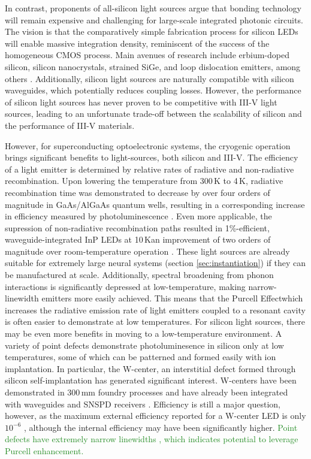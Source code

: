 \documentclass[twocolumn]{article}
\begin{document}
In contrast, proponents of all-silicon light sources argue that bonding technology will remain expensive and challenging for large-scale integrated photonic circuits. The vision is that the comparatively simple fabrication process for silicon LEDs will enable massive integration density, reminiscent of the success of the homogeneous CMOS process. Main avenues of research include erbium-doped silicon, silicon nanocrystals, strained SiGe, and loop dislocation emitters, among others \cite{pavesi2008silicon,again,more,refs,jeff,has,em}. Additionally, silicon light sources are naturally compatible with silicon waveguides, which potentially reduces coupling losses. However, the performance of silicon light sources has never proven to be competitive with III-V light sources, leading to an unfortunate trade-off between the scalability of silicon and the performance of III-V materials. 

However, for superconducting optoelectronic systems, the cryogenic operation brings significant benefits to light-sources, both silicon and III-V. The efficiency of a light emitter is determined by relative rates of radiative and non-radiative recombination. Upon lowering the temperature from 300\,K to 4\,K, radiative recombination time was demonstrated to decrease by over four orders of magnitude in GaAs/AlGaAs quantum wells, resulting in a corresponding increase in efficiency measured by photoluminescence \cite{gurioli1991temperature}. Even more applicable, the supression of non-radiative recombination paths resulted in 1\%-efficient, waveguide-integrated InP LEDs at 10\,K\textemdash an improvement of two orders of magnitude over room-temperature operation \cite{dolores2017waveguide}. These light sources are already suitable for extremely large neural systems (section \ref{sec:instantiation}) if they can be manufactured at scale. Additionally, spectral broadening from phonon interactions is significantly depressed at low-temperature, making narrow-linewidth emitters more easily achieved. This means that the Purcell Effect\textemdash which increases the radiative emission rate of light emitters coupled to a resonant cavity \cite{}\textemdash is often easier to demonstrate at low temperatures. For silicon light sources, there may be even more benefits in moving to a low-temperature environment. A variety of point defects demonstrate photoluminesence in silicon only at low temperatures, some of which can be patterned and formed easily with ion implantation. In particular, the W-center, an interstitial defect formed through silicon self-implantation has generated significant interest. W-centers have been demonstrated in 300\,mm foundry processes \cite{buckley2020optimization} and have already been integrated with waveguides and SNSPD receivers \cite{buckley2020optimization}. Efficiency is still a major question, however, as the maximum external efficiency reported for a W-center LED is only $10^{-6}$ \cite{bao2007point}, although the internal efficiency may have been significantly higher. \textcolor{ForestGreen}{Point defects have extremely narrow linewidths \cite{}, which indicates potential to leverage Purcell enhancement.}
\end{document}
